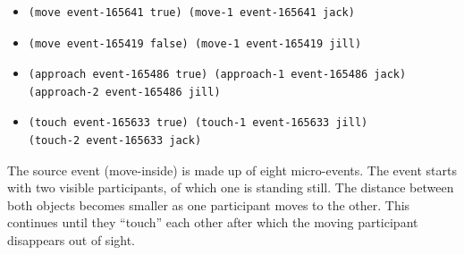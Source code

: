 \begin{itemize}
 \item
\begin{lstlisting}
(move event-165641 true) (move-1 event-165641 jack)
\end{lstlisting}
\item
\begin{lstlisting}
(move event-165419 false) (move-1 event-165419 jill)
\end{lstlisting}
\item
\begin{lstlisting}
(approach event-165486 true) (approach-1 event-165486 jack)
(approach-2 event-165486 jill)
\end{lstlisting}
\item
\begin{lstlisting}
(touch event-165633 true) (touch-1 event-165633 jill)
(touch-2 event-165633 jack) 
\end{lstlisting}
\end{itemize}

 

The source event (move-inside) is made up of eight micro-events. The event starts with two visible participants, of which one is standing still. The distance between both objects becomes smaller as one participant moves to the other. This continues until they ``touch'' each other after which the moving participant disappears out of sight.

